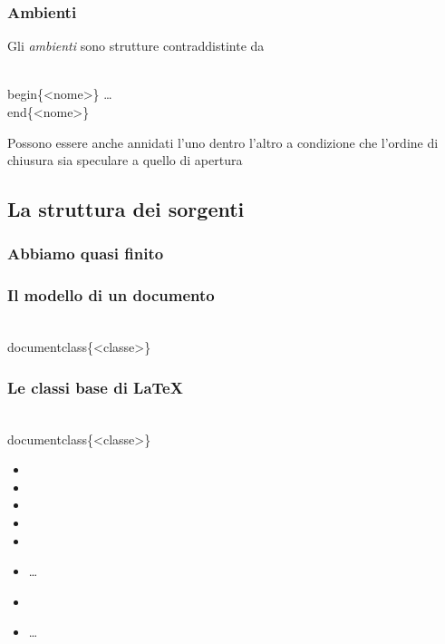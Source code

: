 \documentclass[svgnames,%
	ucs,%
	pdftex]{guitbeamer}
\begin{document}
\begin{frame}
  \frametitle{Ambienti}
	Gli \emph{ambienti} sono strutture contraddistinte da
	\begin{LaTeXcode}
		\\begin\{\alert{<nome>}\}\n
		\quad\dots\n
		\\end\{\alert{<nome>}\}
	\end{LaTeXcode}
  \medskip
	Possono essere anche annidati l'uno dentro l'altro a condizione che
	l'ordine di chiusura sia speculare a quello di apertura
\end{frame}
\subsection{La struttura dei sorgenti}
\begin{frame}
  \frametitle{Abbiamo quasi finito}
\end{frame}
\begin{frame}
  \frametitle{Il modello di un documento}
	\begin{LaTeXcode}
		\\documentclass\{\alert{<classe>}\}
	\end{LaTeXcode}
\end{frame}
\begin{frame}
  \frametitle{Le classi base di \LaTeX}
	\begin{LaTeXcode}
		\\documentclass\{\alert{<classe>}\}
	\end{LaTeXcode}
	\begin{itemize}
		\item{}
		\item{}
		\item{}
		\item{}
		\item{}
		\item\dots
		\item{}
		\item\dots
	\end{itemize}
\end{frame}
\end{document}

